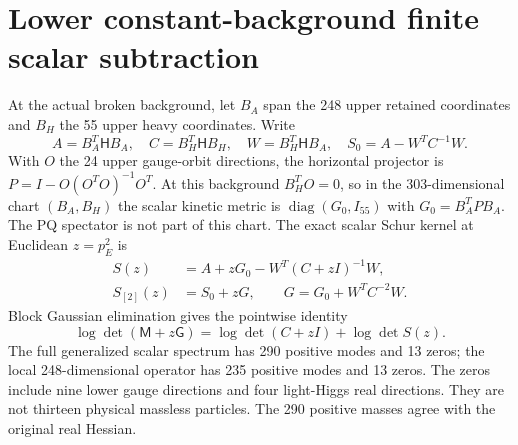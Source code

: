 \documentclass[11pt]{article}
\newcommand{\diag}{\operatorname{diag}}
\begin{document}
\section{Lower constant-background finite scalar subtraction}
At the actual broken background, let $B_A$ span the 248 upper retained
coordinates and $B_H$ the 55 upper heavy coordinates. Write
\begin{equation}
 A=B_A^T\mathsf HB_A,\quad C=B_H^T\mathsf HB_H,\quad
 W=B_H^T\mathsf HB_A,\quad S_0=A-W^TC^{-1}W.
\end{equation}
With $O$ the 24 upper gauge-orbit directions, the horizontal projector
is $P=I-O(O^TO)^{-1}O^T$. At this background $B_H^TO=0$, so in the
303-dimensional chart $(B_A,B_H)$ the scalar kinetic metric is
$\diag(G_0,I_{55})$ with $G_0=B_A^TPB_A$. The PQ spectator is not part
of this chart. The exact scalar Schur kernel at Euclidean $z=p_E^2$ is
\begin{align}
 S(z)&=A+zG_0-W^T(C+zI)^{-1}W,\\
 S_{[2]}(z)&=S_0+zG,\qquad G=G_0+W^TC^{-2}W.
 \label{eq:nonlocal}
\end{align}
Block Gaussian elimination gives the pointwise identity
\begin{equation}
 \log\det(\mathsf M+z\mathsf G)
 =\log\det(C+zI)+\log\det S(z).
 \label{eq:det}
\end{equation}
The full generalized scalar spectrum has 290 positive modes and 13
zeros; the local 248-dimensional operator has 235 positive modes and
13 zeros. The zeros include nine lower gauge directions and four
light-Higgs real directions. They are not thirteen physical massless
particles. The 290 positive masses agree with the original real Hessian.
\end{document}
